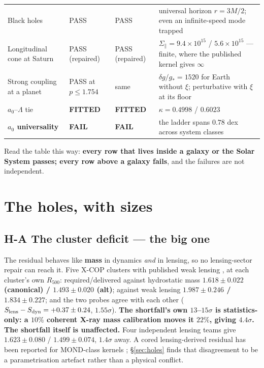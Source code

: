 \documentclass[11pt,letterpaper]{article}
\begin{document}
\begin{small}
\begin{longtable}{L{0.205\textwidth}L{0.145\textwidth}L{0.14\textwidth}L{0.37\textwidth}}
Black holes & PASS & PASS & universal horizon $r=3M/2$; even an infinite-speed mode trapped\\
Longitudinal cone at Saturn & PASS (repaired) & PASS (repaired) & $\Sigma_\parallel=9.4\times10^{15}$ / $5.6\times10^{15}$ --- finite, where the published kernel gives $\infty$\\
Strong coupling at a planet & PASS at $p\le1.754$ & same & $\delta g/g_*=1520$ for Earth without $\xi$; perturbative with $\xi$ at its floor\\
$a_0$--$\Lambda$ tie & \textbf{FITTED} & \textbf{FITTED} & $\kappa=0.4998$ / $0.6023$\\
\textbf{$a_0$ universality} & \textbf{FAIL} & \textbf{FAIL} & the ladder spans $0.78$ dex across system classes\\
\bottomrule
\end{longtable}
\end{small}

Read the table this way: \textbf{every row that lives inside a galaxy or the Solar System passes; every row above a galaxy fails}, and the failures are not independent.

\section{The holes, with sizes}
\subsection{H-A The cluster deficit --- the big one}\label{sec:HA}
The residual behaves like \textbf{mass} in dynamics \emph{and} in lensing, so no lensing-sector repair can reach it. Five X-COP clusters \cite{eckert19,ettori19} with published weak lensing \cite{herbonnet20}, at each cluster's own $R_{500}$: required/delivered against hydrostatic mass \textbf{$1.618\pm0.022$ (canonical) / $1.493\pm0.020$ (alt)}; against weak lensing \textbf{$1.987\pm0.246$ / $1.834\pm0.227$}; and the two probes agree with each other ($S_{\rm lens}-S_{\rm dyn}=+0.37\pm0.24$, $1.55\sigma$). \textbf{The shortfall's own $13$--$15\sigma$ is statistics-only: a $10\%$ coherent X-ray mass calibration moves it $22\%$, giving $4.4\sigma$. The shortfall itself is unaffected.} Four independent lensing teams give $1.623\pm0.080$ / $1.499\pm0.074$, $1.4\sigma$ away. A cored lensing-derived residual has been reported for MOND-class kernels \cite{famaey25}; \S\ref{sec:holes} finds that disagreement to be a parametrisation artefact rather than a physical conflict.
\end{document}

